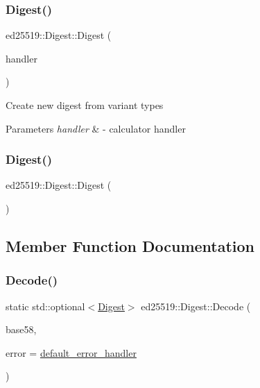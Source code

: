 \subsubsection{\texorpdfstring{Digest()}{Digest()}\hspace{0.1cm}{\footnotesize\ttfamily [1/2]}}
{\footnotesize\ttfamily ed25519\+::\+Digest\+::\+Digest (\begin{DoxyParamCaption}\item[{\mbox{\hyperlink{classed25519_1_1_digest_ae086cdedc0e704dd1d869138648b2d1a}{context}}}]{handler }\end{DoxyParamCaption})}

Create new digest from variant types 
\begin{DoxyParams}{Parameters}
{\em handler} & -\/ calculator handler \\
\hline
\end{DoxyParams}
\mbox{\label{classed25519_1_1_digest_a032b74cccbe09b962b0d148ce6fa9eaa}} 
\subsubsection{\texorpdfstring{Digest()}{Digest()}\hspace{0.1cm}{\footnotesize\ttfamily [2/2]}}
{\footnotesize\ttfamily ed25519\+::\+Digest\+::\+Digest (\begin{DoxyParamCaption}{ }\end{DoxyParamCaption})}



\subsection{Member Function Documentation}
\mbox{\label{classed25519_1_1_digest_a3e74ff17e4b4540bdca27cf1914a4641}} 
\subsubsection{\texorpdfstring{Decode()}{Decode()}}
{\footnotesize\ttfamily static std\+::optional$<$\mbox{\hyperlink{classed25519_1_1_digest}{Digest}}$>$ ed25519\+::\+Digest\+::\+Decode (\begin{DoxyParamCaption}\item[{const std\+::string \&}]{base58,  }\item[{const \mbox{\hyperlink{namespaceed25519_a6ba572942b3c18591fc869d52a6b16e6}{Error\+Handler}} \&}]{error = {\ttfamily \mbox{\hyperlink{namespaceed25519_a7c7bb6ed17541162959c33ed3e3b15fb}{default\+\_\+error\+\_\+handler}}} }\end{DoxyParamCaption})\hspace{0.3cm}{\ttfamily [static]}}

